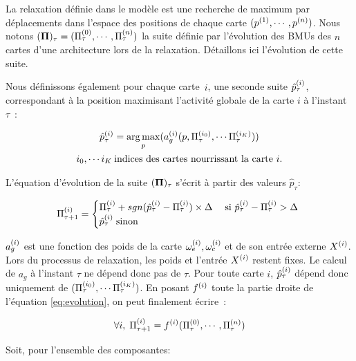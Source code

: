 \documentclass[../main]{subfiles}
\begin{document}
La relaxation définie dans le modèle est une recherche de maximum par déplacements dans l'espace des positions de chaque carte $(p^{({1})},\cdots, p^{({n})})$.
Nous notons $(\mathbf{\Pi})_\tau = (\Pi^{({0})}_\tau,\cdots,\Pi^{({n})}_\tau)$ la suite définie par l'évolution des BMUs des $n$ cartes d'une architecture lors de la relaxation.
Détaillons ici l'évolution de cette suite.

Nous définissons également pour chaque carte~$i$, une seconde suite $\hat{p}^{({i})}_\tau$, correspondant à la position maximisant l'activité globale de la carte $i$ à l'instant $\tau$~:

\begin{equation}
\begin{gathered}
\hat{p}^{({i})}_{\tau} = \operatorname*{arg\,max}_p(a_g^{({i})}(p,\Pi^{({i_0})}_\tau, \cdots \Pi^{({i_K})}_\tau))\\
 i_0, \cdots i_K \: \text{indices des cartes nourrissant la carte $i$}.
\end{gathered}
\label{eq:pstar}
\end{equation}

L'équation d'évolution de la suite $(\mathbf{\Pi})_\tau$ s'écrit à partir des valeurs $\hat{p}_\tau$:

\begin{equation}
\Pi^{({i})}_{\tau+1} = 
\begin{cases}
\Pi^{({i})}_{\tau} + sgn(\hat{p}^{({i})}_{\tau} - \Pi^{({i})}_{\tau}) \times \Delta \; & \text{si $\hat{p}^{({i})}_{\tau} - \Pi^{({i})}_{\tau} > \Delta$ } \\
\hat{p}^{({i})}_{\tau} \; \text{sinon}	
\end{cases}
\label{eq:evolution}
\end{equation}

$a_g^{({i})}$ est une fonction des poids de la carte $\omega_{e}^{({i})}, \omega_{c}^{({i})}$ et de son entrée externe $X^{({i})}$. 
Lors du processus de relaxation, les poids et l'entrée $X^{({i})}$ restent fixes. 
Le calcul de $a_g$ à l'instant $\tau$ ne dépend donc pas de $\tau$.
Pour toute carte $i$, $\hat{p}^{({i})}_{\tau}$ dépend donc uniquement de $(\Pi^{({i_0})}_\tau, \cdots \Pi^{({i_K})}_\tau)$. 
En posant $f^{({i})}$ toute la partie droite de l'équation \ref{eq:evolution}, on peut finalement écrire~:

\begin{equation}
\forall i, \; \Pi^{({i})}_{\tau +1} = f^{({i})}(\Pi^{({0})}_\tau,\cdots,\Pi^{({n})}_\tau)
\label{eq:fonction}
\end{equation}

Soit, pour l'ensemble des composantes: 
\end{document}
